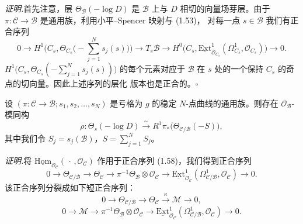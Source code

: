 \noindent\textit{证明.}\quad 首先注意，层 $\Theta_{\mathcal{B}}(-\log D)$ 是
$\mathcal{B}$ 上与 $D$ 相切的向量场芽层。由于
$\pi:\mathcal{C}\to\mathcal{B}$ 是通用族，利用小平–Spencer 映射与 (1.53)，
对每一点 $s\in\mathcal{B}$ 我们有正合序列
\[
0\to H^1\Big(C_s,\Theta_{C_s}\Big(-\sum_{j=1}^{N}s_j(s)\Big)\Big)
\to T_s\mathcal{B}\to H^0\big(C_s,
\underline{\mathrm{Ext}}^1_{\mathcal{O}_{C_s}}
(\Omega^1_{C_s},\mathcal{O}_{C_s})\big)\to 0.
\]
$H^1\big(C_s,\Theta_{C_s}(-\sum_{j=1}^{N}s_j(s))\big)$ 的每个元素对应于
$\mathcal{B}$ 在 $s$ 处的一个保持 $C_s$ 的奇点的切向量。因此上述序列的层化
版本也是正合的。\hfill$\square$

\begin{theorem}[1.36]
设 $(\pi:\mathcal{C}\to\mathcal{B};s_1,s_2,\dots,s_N)$ 是亏格为 $g$ 的稳定
$N$-点曲线的通用族。则存在 $\mathcal{O}_{\mathcal{B}}$-模同构
\begin{equation}
\rho:\Theta_s(-\log D)\xrightarrow{\ \sim\ }
R^1\pi_*\big(\Theta_{\mathcal{C}/\mathcal{B}}(-S)\big), \tag{1.63}
\end{equation}
其中我们令 $S_j=s_j(\mathcal{B})$，$S=\sum_{j=1}^{N}S_j$。
\end{theorem}

\noindent\textit{证明.}\quad 将
$\underline{\mathrm{Hom}}_{\mathcal{O}_{\mathcal{C}}}(\,\cdot\,,
\mathcal{O}_{\mathcal{C}})$ 作用于正合序列 (1.58)，我们得到正合序列
\[
0\to\Theta_{\mathcal{C}/\mathcal{B}}\to\Theta_{\mathcal{C}}
\to\pi^{-1}\Theta_{\mathcal{B}}\otimes\mathcal{O}_{\mathcal{C}}
\to\underline{\mathrm{Ext}}^1_{\mathcal{O}_{\mathcal{C}}}
(\Omega^1_{\mathcal{C}/\mathcal{B}},\mathcal{O}_{\mathcal{C}})\to 0.
\]
该正合序列分裂成如下短正合序列：
\begin{equation}
0\to\Theta_{\mathcal{C}/\mathcal{B}}\to\Theta_{\mathcal{C}}
\xrightarrow{\ \kappa\ }\mathcal{M}\to 0, \tag{1.64}
\end{equation}
\begin{equation}
0\to\mathcal{M}\to\pi^{-1}\Theta_{\mathcal{B}}\otimes\mathcal{O}_{\mathcal{C}}
\to\underline{\mathrm{Ext}}^1_{\mathcal{O}_{\mathcal{C}}}
(\Omega^1_{\mathcal{C}/\mathcal{B}},\mathcal{O}_{\mathcal{C}})\to 0. \tag{1.65}
\end{equation}

